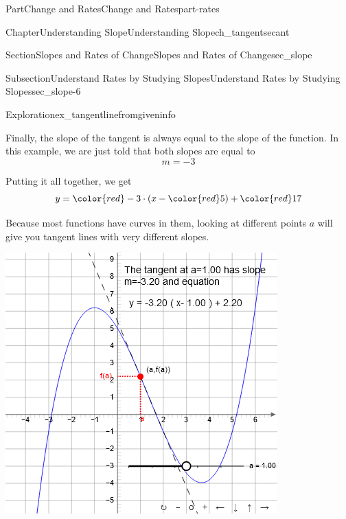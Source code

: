 \documentclass[oneside,10pt,]{tufte-book}
\numberwithin{equation}{chapter}
\begin{document}
\begin{partptx}{Part}{Change and Rates}{}{Change and Rates}{}{}{part-rates}
\begin{chapterptx}{Chapter}{Understanding Slope}{}{Understanding Slope}{}{}{ch_tangentsecant}
\begin{sectionptx}{Section}{Slopes and Rates of Change}{}{Slopes and Rates of Change}{}{}{sec_slope}
\begin{subsectionptx}{Subsection}{Understand Rates by Studying Slopes}{}{Understand Rates by Studying Slopes}{}{}{sec_slope-6}
\begin{exploration}{Exploration}{}{ex_tangentlinefromgiveninfo}
%
\par
Finally, the slope of the tangent is always equal to the slope of the function.  In this example, we are just told that both slopes are equal to%
\begin{equation*}
m = -3 
\end{equation*}
%
\par
Putting it all together, we get%
\begin{equation*}
y = {\color{red} -3} \cdot (x - {\color{red} 5}) + {\color{red} 17}
\end{equation*}
%
\end{exploration}%
Because most functions have curves in them, looking at different points \(a\) will give you tangent lines with very different slopes.%
\begin{sidebyside}{2}{0.075}{0.075}{0.17}%
\begin{sbspanel}{0.47}%
\includegraphics[width=\linewidth]{external/jsxgraph-slope-via-tangent.png}
\end{sbspanel}%
\begin{sbspanel}{0.21}%

\end{sbspanel}
\end{sidebyside}
\end{subsectionptx}
\end{sectionptx}
\end{chapterptx}
\end{partptx}
\end{document}
